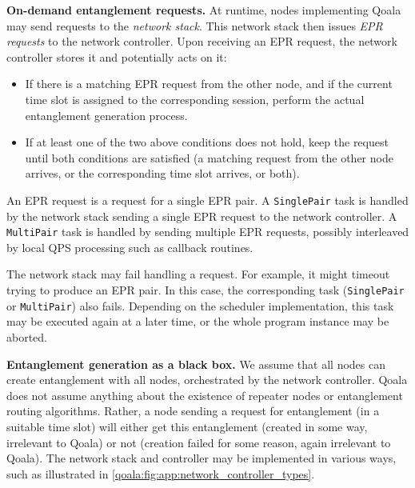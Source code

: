 \textbf{On-demand entanglement requests.} At runtime, nodes implementing Qoala may send requests to the \textit{network stack}.
This network stack then issues \textit{EPR requests} to the network controller.
Upon receiving an EPR request, the network controller stores it and potentially acts on it:
\begin{itemize}
    \item If there is a matching EPR request from the other node, and if the current time slot is assigned to the corresponding session, perform the actual entanglement generation process.
    \item If at least one of the two above conditions does not hold, keep the request until both conditions are satisfied (a matching request from the other node arrives, or the corresponding time slot arrives, or both).
\end{itemize}

An EPR request is a request for a single EPR pair. A \texttt{SinglePair} task is handled by the network stack sending a single EPR request to the network controller.
A \texttt{MultiPair} task is handled by sending multiple EPR requests, possibly interleaved by local QPS processing such as callback routines.

The network stack may fail handling a request. For example, it might timeout trying to produce an EPR pair. In this case, the corresponding task (\texttt{SinglePair} or \texttt{MultiPair}) also fails.
Depending on the scheduler implementation, this task may be executed again at a later time, or the whole program instance may be aborted.


\textbf{Entanglement generation as a black box.} We assume that all nodes can create entanglement with all nodes, orchestrated by the network controller.
Qoala does not assume anything about the existence of repeater nodes or entanglement routing algorithms.
Rather, a node sending a request for entanglement (in a suitable time slot) will either get this entanglement (created in some way, irrelevant to Qoala) or not (creation failed for some reason, again irrelevant to Qoala).
The network stack and controller may be implemented in various ways, such as illustrated in \cref{qoala:fig:app:network_controller_types}.

